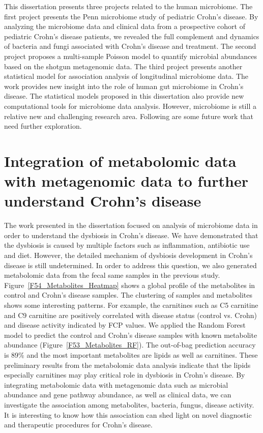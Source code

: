 \label{chpt:discussion}

This dissertation presents three projects related to the human microbiome. The first project presents the Penn microbiome study of pediatric Crohn’s disease. By analyzing the microbiome data and clinical data from a prospective cohort of pediatric Crohn’s disease patients, we revealed the full complement and dynamics of bacteria and fungi associated with Crohn’s disease and treatment. The second project proposes a multi-sample Poisson model to quantify microbial abundances based on the shotgun metagenomic data. The third project presents another statistical model for association analysis of longitudinal microbiome data. The work provides new insight into the role of human gut microbiome in Crohn’s disease. The statistical models proposed in this dissertation also provide new computational tools for microbiome data analysis. However, microbiome is still a relative new and challenging research area. Following are some future work that need further exploration.

\section{Integration of metabolomic data with metagenomic data to further understand Crohn's disease}
The work presented in the dissertation focused on analysis of microbiome data in order to understand the dysbiosis in Crohn's disease. We have demonstrated that the dysbiosis is caused by multiple factors such as inflammation, antibiotic use and diet. However, the detailed mechanism of dysbiosis development in Crohn's disease is still undetermined. In order to address this question, we also generated metabolomic data from the fecal same samples in the previous study. 
Figure~\ref{F54_Metabolites_Heatmap} shows a global profile of the metabolites in control and Crohn's disease samples.  The clustering of samples and metabolites shows some interesting patterns. For example, the carnitines such as C5 carnitine and C9 carnitine are positively correlated with disease status (control vs. Crohn) and disease activity indicated by FCP values.  We applied the Random Forest model to predict the control and Crohn's disease samples with known metabolite abundance (Figure~\ref{F53_Metabolites_RF}). The out-of-bag prediction accuracy is 89\% and the most important metabolites are lipids as well as carnitines. These preliminary results from the metabolomic data analysis indicate that the lipids especially carnitines may play critical role in dysbiosis in Crohn's disease. By integrating metabolomic data with metagenomic data such as microbial abundance and gene pathway abundance, as well as clinical data, we can investigate the association among metabolites, bacteria, fungus, disease activity. It is interesting to know how this association can shed light on novel diagnostic and therapeutic procedures for Crohn's disease. 


